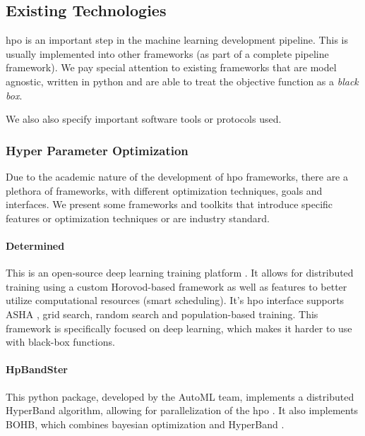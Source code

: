 
\subsection{Existing Technologies}

\acrfull{hpo} is an important step in the machine learning development pipeline. This is usually implemented into other frameworks (as part of a complete pipeline framework). We pay special attention to existing frameworks that are model agnostic, written in \acrfull{python} and are able to treat the objective function as a \textit{black box}.

We also also specify important software tools or protocols used.

\subsubsection{Hyper Parameter Optimization}

Due to the academic nature of the development of \acrshort{hpo} frameworks, there are a plethora of frameworks, with different optimization techniques, goals and interfaces. We present some frameworks and toolkits that introduce specific features or optimization techniques or are industry standard.

\paragraph{Determined} This is an open-source deep learning training platform \parencite{determined-ai}. It allows for distributed training using a custom Horovod-based framework \parencite{alex2018horovod} as well as features to better utilize computational resources (smart scheduling). It's \acrshort{hpo} interface supports ASHA \parencite{li2018massively}, grid search, random search and population-based training. This framework is specifically focused on deep learning, which makes it harder to use with black-box functions.

\paragraph{HpBandSter} This \acrshort{python} package, developed by the AutoML team, implements a distributed HyperBand algorithm, allowing for parallelization of the \acrshort{hpo} \parencite{hpbandster}. It also implements BOHB, which combines bayesian optimization and HyperBand \parencite{pmlr-v80-falkner18a}.

